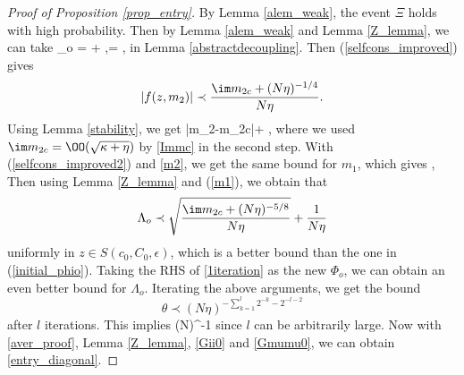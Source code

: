 \begin{proof}[Proof of Proposition \ref{prop_entry}]

By Lemma \ref{alem_weak}, the event $\Xi$ holds with high probability. Then by Lemma \ref{alem_weak} and Lemma \ref{Z_lemma}, we can take
\be\label{initial_phio}
\Phi_o =  + ,\quad \Phi= ,
\ee
 in Lemma \ref{abstractdecoupling}. 
Then (\ref{selfcons_improved}) gives
$$|f(z,m_2)| \prec\frac{ \im m_{2c} + (N\eta)^{-1/4}}{N\eta}.$$
Using Lemma \ref{stability}, we get
\be\label{m2}
|m_2-m_{2c}|\prec{}+ \prec {} ,
\ee
where we used $\im m_{2c}=\OO(\sqrt{\kappa+\eta})$ by \eqref{Immc} in the second step. With (\ref{selfcons_improved2}) and \eqref{m2}, we get the same bound for $m_1$, which gives
\be\label{m1}
\theta {} ,
\ee
Then using Lemma \ref{Z_lemma} and (\ref{m1}), we obtain that
\begin{align}\label{1iteration}
\Lambda_o \prec  \sqrt{\frac{\im m_{2c} + (N\eta)^{-5/8}}{N\eta}} + \frac{1}{N\eta}
\end{align}
uniformly in $z\in S(c_0,C_0,\epsilon)$, which is a better bound than the one in (\ref{initial_phio}). Taking the RHS of \eqref{1iteration} as the new $\Phi_o$, we can obtain an even better bound for $\Lambda_o$. Iterating the above arguments, we get the bound
$$\theta \prec \left({N\eta}\right)^{-\sum_{k=1}^l 2^{-k} - 2^{-l-2} }$$
after $l$ iterations. This implies %
\be\label{aver_proof}
\theta\prec(N\eta)^{-1}
\ee
since $l$ can be arbitrarily large. Now with \eqref{aver_proof}, Lemma \ref{Z_lemma}, \eqref{Gii0} and \eqref{Gmumu0}, we can obtain \eqref{entry_diagonal}. 
\end{proof}

